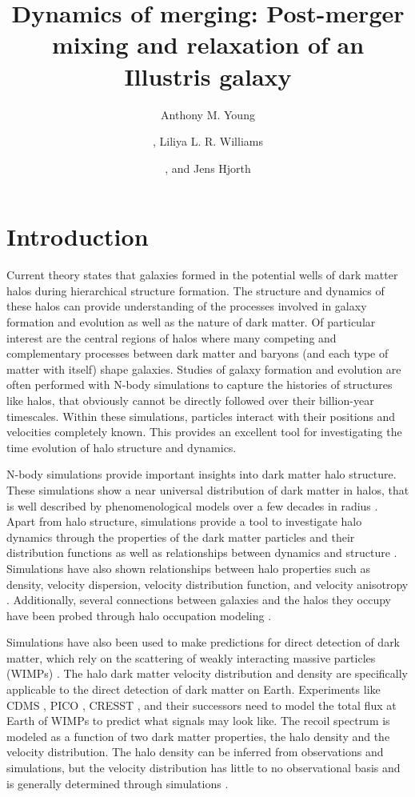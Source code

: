 \documentclass[a4paper,11pt]{article}
\title{\boldmath Dynamics of merging: Post-merger mixing and relaxation of an Illustris galaxy}
\author[1]{Anthony M. Young}
\author[1]{, Liliya L. R. Williams}
\author[2]{, and Jens Hjorth}
\affiliation[1]{School of Physics and Astronomy, University of Minnesota, 116 Church Street SE, Minneapolis, MN 55455, USA}
\affiliation[2]{Dark Cosmology Centre, Niels Bohr Institute, University of Copenhagen, Juliane Maries Vej 30, DK-2100 Copenhagen, Denmark}
\begin{document}
\maketitle
\flushbottom

\section{Introduction}\label{Introduction}

Current theory states that galaxies formed in the potential wells of dark matter halos during hierarchical structure formation.  The structure and dynamics of these halos can 
provide understanding of the processes involved in galaxy formation and evolution as well as the nature of dark matter. Of particular interest are the 
central regions of halos where many competing and complementary processes between dark matter and baryons (and each type of matter with itself) shape galaxies.  Studies of galaxy 
formation and evolution are often performed with N-body simulations to capture the histories of structures like halos, that obviously 
cannot be directly followed over their billion-year timescales. Within these simulations, particles interact with their positions 
and velocities completely known.  This provides an excellent tool for investigating the time evolution of halo structure and dynamics.

N-body simulations provide important insights into dark matter halo structure.  These simulations show a near 
universal distribution of dark matter in halos, that is well described by phenomenological models over a few decades in radius \citep{Nav04,Sta09}.  Apart 
from halo structure, simulations provide a tool to investigate halo dynamics through the properties of the dark matter particles and their 
distribution functions \citep{Deh05, Vas08, Woj08, Nat97} as well as relationships between dynamics and structure \citep{Ton06}.  Simulations have also shown 
relationships between halo properties such as density, velocity dispersion, 
velocity distribution function, and velocity anisotropy \citep{Tay01, Han09, Mun13, Wil14}.  Additionally, several connections between galaxies and the halos 
they occupy have been probed through halo occupation modeling \citep{Kau97,Sel00, Hea16, Bos16, Fen16}.

Simulations have also been used to make predictions for direct detection of dark matter, which rely on the scattering of weakly interacting massive particles 
(WIMPs) \citep{Vog09}.  The halo dark matter velocity distribution and density are specifically applicable to the direct detection of dark matter on Earth.  
Experiments like CDMS \citep{Ake04}, PICO \citep{Amo16}, CRESST \citep{Ang02}, and their successors need to model the total flux at Earth of WIMPs to predict 
what signals may look like.  The recoil spectrum is modeled as a function of two dark matter properties, the halo density and the velocity distribution.   
The halo density can be inferred from observations and simulations, but the velocity distribution has little to no observational basis and is generally 
determined through simulations \citep{Lew96}. 
\end{document}

